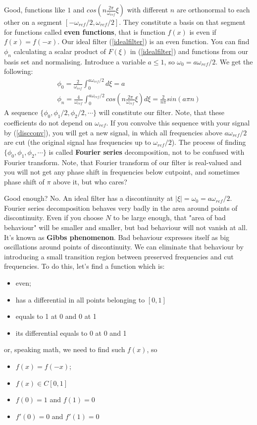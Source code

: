\documentclass[a4paper,11pt,fleqn]{article}
\let\oldref\ref
\renewcommand{\ref}[1]{(\oldref{#1})}
\begin{document}
Good, functions like $1$ and $cos(n \frac{2 \pi}{\omega_{ref}} \xi)$ with different $n$ are orthonormal to each other on a segment $[-\omega_{ref}/2, \omega_{ref}/2]$. They constitute a basis
on that segment for functions called \textbf{even functions}, that is function $f(x)$ is even if $f(x)=f(-x)$. Our ideal filter \ref{idealfilter} is an even function. You can find $\phi_{n}$
calculating a scalar product of $F(\xi)$ in \ref{idealfilter} and functions from our basis set and normalising. Introduce a variable $a \leq 1$, so $\omega_{0} = a \omega_{ref}/2$. We get the following:
\begin{equation}
\begin{aligned}
\phi_{0} = \frac{2}{\omega_{ref}}\int_{0}^{a \omega_{ref}/2}d\xi = a \\
\phi_{n} = \frac{4}{\omega_{ref}}\int_{0}^{a \omega_{ref}/2}cos(n \frac{2 \pi}{\omega_{ref}} \xi)d\xi = \frac{2}{n \pi} sin (a \pi n)
\end{aligned}
\end{equation}
A sequence $\{\phi_{0}, \phi_{1}/2, \phi_{2}/2, \cdots\}$ will constitute our filter. Note, that these coefficients do not depend on $\omega_{ref}$. If you convolve this sequence with your signal
by \ref{discconv}, you will get a new signal, in which all frequencies above $a\omega_{ref}/2$ are cut (the original signal has frequencies up to $\omega_{ref}/2$). The process of finding
$\{\phi_{0}, \phi_{1}, \phi_{2}, \cdots\}$ is called \textbf{Fourier series} decomposition, not to be confused with Fourier transform. Note, that Fourier transform of our filter is real-valued
and you will not get any phase shift in frequencies below cutpoint, and sometimes phase shift of $\pi$ above it, but who cares?

Good enough? No. An ideal filter has a discontinuity at $\left|\xi\right| = \omega_{0} = a \omega_{ref}/2$. Fourier series decomposition behaves very badly in the area around points of discontinuity. Even if
you choose $N$ to be large enough, that "area of bad behaviour" will be smaller and smaller, but bad behaviour will not vanish at all. It's known as \textbf{Gibbs phenomenon}. Bad behaviour expresses itself as
big oscillations around points of discontinuity. We can eliminate that behaviour by introducing a small transition region between preserved frequencies and cut frequencies. To do this, let's find a function which is:
\begin{itemize}
\item even;
\item has a differential in all points belonging to $[0,1]$
\item equals to 1 at 0 and 0 at 1
\item its differential equals to 0 at 0 and 1
\end{itemize}
or, speaking math, we need to find such $f(x)$, so
\begin{itemize}
\item $f(x) = f(-x)$;
\item $f(x) \in C[0,1]$
\item $f(0) = 1$ and $f(1) = 0$
\item $f'(0) = 0$ and $f'(1) = 0$
\end{itemize}
\end{document}
